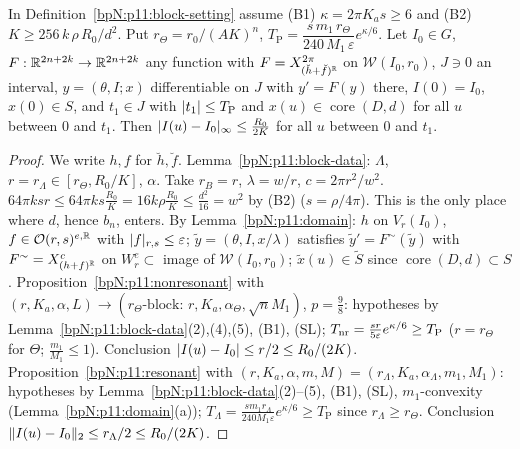 \begin{theorem}\label{bpN:p11:block}
In Definition~\ref{bpN:p11:block-setting} assume (B1) $\kappa=2\pi K_as\ge6$ and (B2) $K\ge256\,k\,\rho\,R_0/d^2$. Put $r_\Theta=r_0/(AK)^n$, $T_{\mathrm P}=\dfrac{s\,m_1\,r_\Theta}{240\,M_1\,\varepsilon}e^{\kappa/6}$. Let $I_0\in G$, $F:\mathbb{R}^{2n+2k}\to\mathbb{R}^{2n+2k}$ any function with $F=X^{2\pi}_{(\breve h+\breve f)^{\mathbb{R}}}$ on $\mathcal W(I_0,r_0)$, $J\ni0$ an interval, $y=(\theta,I;x)$ differentiable on $J$ with $y'=F(y)$ there, $I(0)=I_0$, $x(0)\in S$, and $t_1\in J$ with $\lvert t_1\rvert\le T_{\mathrm P}$ and $x(u)\in\operatorname{core}(D,d)$ for all $u$ between $0$ and $t_1$. Then $\lvert I(u)-I_0\rvert_\infty\le\frac{R_0}{2K}$ for all $u$ between $0$ and $t_1$.
\end{theorem}
\begin{proof}
We write $h,f$ for $\breve h,\breve f$.
\label{stepN:p11:bl-block} Lemma~\ref{bpN:p11:block-data}: $\Lambda$, $r=r_\Lambda\in[r_\Theta,R_0/K]$, $\alpha$. Take $r_B=r$, $\lambda=w/r$, $c=2\pi r^2/w^2$.
\label{stepN:p11:bl-sl} $64\pi ksr\le64\pi ks\frac{R_0}K=16k\rho\frac{R_0}K\le\frac{d^2}{16}=w^2$ by (B2) ($s=\rho/4\pi$). This is the only place where $d$, hence $b_n$, enters.
\label{stepN:p11:bl-ext} By Lemma~\ref{bpN:p11:domain}: $h$ on $V_r(I_0)$, $f\in\mathcal O(r,s)^{e,\mathbb{R}}$ with $\lvert f\rvert_{r,s}\le\varepsilon$; $\tilde y=(\theta,I,x/\lambda)$ satisfies $\tilde y'=F^\sim(\tilde y)$ with $F^\sim=X^c_{(h+f)^{\mathbb{R}}}$ on $W^e_r\subset$ image of $\mathcal W(I_0,r_0)$; $\tilde x(u)\in\tilde S$ since $\operatorname{core}(D,d)\subset S$.
\label{stepN:p11:bl-theta} Proposition~\ref{bpN:p11:nonresonant} with $(r,K_a,\alpha,L)\to(r_\Theta\text{-block: }r,K_a,\alpha_\Theta,\sqrt nM_1)$, $p=\frac98$: hypotheses by Lemma~\ref{bpN:p11:block-data}(2),(4),(5), (B1), (SL); $T_{\rm nr}=\frac{sr}{5\varepsilon}e^{\kappa/6}\ge T_{\mathrm P}$ ($r=r_\Theta$ for $\Theta$; $\frac{m_1}{M_1}\le1$). Conclusion $\lvert I(u)-I_0\rvert\le r/2\le R_0/(2K)$.
\label{stepN:p11:bl-res} Proposition~\ref{bpN:p11:resonant} with $(r,K_a,\alpha,m,M)=(r_\Lambda,K_a,\alpha_\Lambda,m_1,M_1)$: hypotheses by Lemma~\ref{bpN:p11:block-data}(2)--(5), (B1), (SL), $m_1$-convexity (Lemma~\ref{bpN:p11:domain}(a)); $T_\Lambda=\frac{sm_1r_\Lambda}{240M_1\varepsilon}e^{\kappa/6}\ge T_{\mathrm P}$ since $r_\Lambda\ge r_\Theta$. Conclusion $\lVert I(u)-I_0\rVert_2\le r_\Lambda/2\le R_0/(2K)$.
\end{proof}

